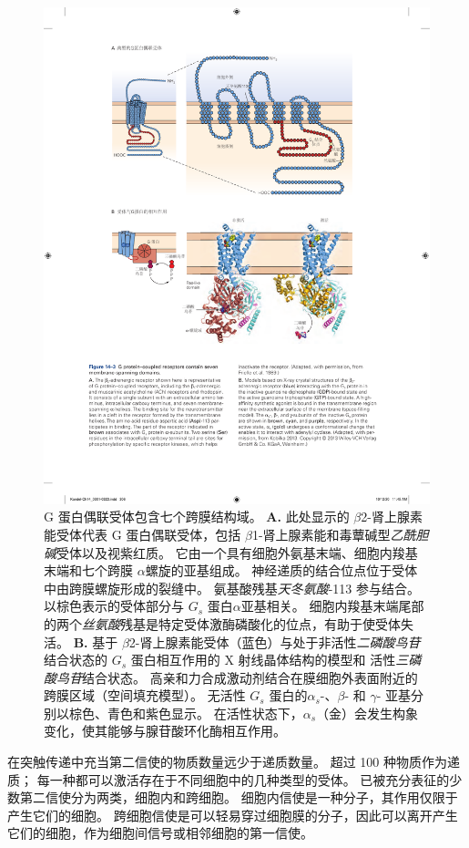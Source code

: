 \begin{figure}[htbp]
	\centering
	\includegraphics[width=0.75\linewidth]{chap14/fig_14_3}
	\caption{G 蛋白偶联受体包含七个跨膜结构域。
		\textbf{A.} 此处显示的 $\beta$2-肾上腺素能受体代表 G 蛋白偶联受体，包括 $\beta$1-肾上腺素能和毒蕈碱型\textit{乙酰胆碱}受体以及视紫红质。
		它由一个具有细胞外氨基末端、细胞内羧基末端和七个跨膜 $\alpha$螺旋的亚基组成。
		神经递质的结合位点位于受体中由跨膜螺旋形成的裂缝中。
		氨基酸残基\textit{天冬氨酸}-113 参与结合。
		以棕色表示的受体部分与 $ G_s $ 蛋白$\alpha$亚基相关。
		细胞内羧基末端尾部的两个\textit{丝氨酸}残基是特定受体激酶磷酸化的位点，有助于使受体失活\cite{frielle1989beta}。
		\textbf{B.} 基于 $\beta$2-肾上腺素能受体（蓝色）与处于非活性\textit{二磷酸鸟苷}结合状态的 $ G_s $ 蛋白相互作用的 X 射线晶体结构的模型和 活性\textit{三磷酸鸟苷}结合状态。
		高亲和力合成激动剂结合在膜细胞外表面附近的跨膜区域（空间填充模型）。
		无活性 $ G_s $ 蛋白的$\alpha_s$-、$\beta$- 和 $\gamma$- 亚基分别以棕色、青色和紫色显示。
		在活性状态下，$\alpha_s$（金）会发生构象变化，使其能够与腺苷酸环化酶相互作用\cite{kobilka2013structural}。}
	\label{fig:14_3}
\end{figure}


在突触传递中充当第二信使的物质数量远少于递质数量。
超过 100 种物质作为递质；
每一种都可以激活存在于不同细胞中的几种类型的受体。
已被充分表征的少数第二信使分为两类，细胞内和跨细胞。
细胞内信使是一种分子，其作用仅限于产生它们的细胞。
跨细胞信使是可以轻易穿过细胞膜的分子，因此可以离开产生它们的细胞，作为细胞间信号或相邻细胞的第一信使。


